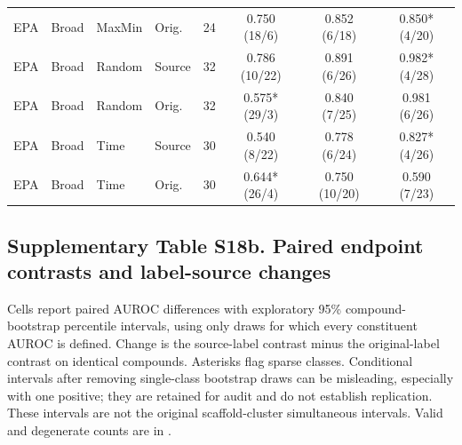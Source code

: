 \begin{longtable}{llllrccc}
EPA & Broad & MaxMin & Orig. & 24 & 0.750 (18/6) & 0.852 (6/18) & 0.850* (4/20) \\
EPA & Broad & Random & Source & 32 & 0.786 (10/22) & 0.891 (6/26) & 0.982* (4/28) \\
EPA & Broad & Random & Orig. & 32 & 0.575* (29/3) & 0.840 (7/25) & 0.981 (6/26) \\
EPA & Broad & Time & Source & 30 & 0.540 (8/22) & 0.778 (6/24) & 0.827* (4/26) \\
EPA & Broad & Time & Orig. & 30 & 0.644* (26/4) & 0.750 (10/20) & 0.590 (7/23) \\

\end{longtable}\endgroup

\subsection*{Supplementary Table S18b. Paired endpoint contrasts and label-source changes}

Cells report paired AUROC differences with exploratory 95\% compound-bootstrap percentile intervals, using only draws for which every constituent AUROC is defined. Change is the source-label contrast minus the original-label contrast on identical compounds. Asterisks flag sparse classes. Conditional intervals after removing single-class bootstrap draws can be misleading, especially with one positive; they are retained for audit and do not establish replication. These intervals are not the original scaffold-cluster simultaneous intervals. Valid and degenerate counts are in .

\begingroup\small\setlength{\tabcolsep}{4pt}

